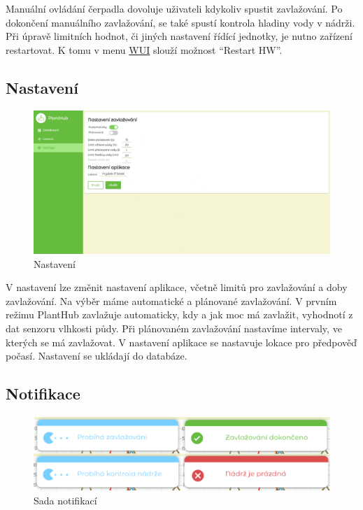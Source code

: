 \documentclass[czech,12pt,a4paper]{article}
\begin{document}
Manuální ovládání čerpadla dovoluje uživateli kdykoliv spustit zavlažování. Po dokončení manuálního zavlažování, se také spustí kontrola hladiny vody v nádrži. Při úpravě limitních hodnot, či jiných nastavení řídící jednotky, je nutno zařízení restartovat. K tomu v menu \underline{\ac{WUI}} slouží možnost \enquote{Restart HW}.

\clearpage

\subsection{Nastavení}

\begin{figure}[h]
	\centering
	\includegraphics[width=\linewidth]{web-ui-settings.png}
	\caption{Nastavení}
\end{figure}

V nastavení lze změnit nastavení aplikace, včetně limitů pro zavlažování a doby zavlažování. Na výběr máme automatické a plánované zavlažování. V prvním režimu PlantHub zavlažuje automaticky, kdy a jak moc má zavlažit, vyhodnotí z dat senzoru vlhkosti půdy. Při plánovaném zavlažování nastavíme intervaly, ve kterých se má zavlažovat. V nastavení aplikace se nastavuje lokace pro předpověď počasí. Nastavení se ukládají do databáze.

\clearpage

\subsection{Notifikace}

\begin{figure}[h]
	\centering
	\includegraphics[width=\linewidth]{notifikace.png}
	\caption{Sada notifikací}
\end{figure}
\end{document}
